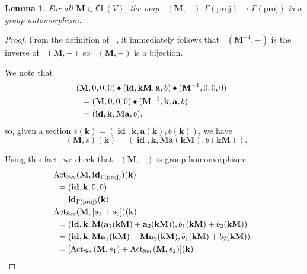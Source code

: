 \documentclass[12pt]{article}
\newcounter{counter}
\theoremstyle{definition}
\theoremstyle{plain}
\newtheorem{lem}[counter]{Lemma}
\newcommand{\id}{\mathop{\mathbf{id}}\nolimits}
\newcommand{\ActSec}
{\mathop{\mathrm{Act}_{\mathrm{Sec}}}}
\begin{document}
\begin{lem}\label{lem:ActSecAutomorphism}
    For all \(\mathbf{M} \in \mathsf{GL}(V)\), the map \(\ActSec (\mathbf{M}, -)  \colon \Gamma(\mathrm{proj}) \to \Gamma(\mathrm{proj})\) is a group automorphism.
\end{lem}

\begin{proof}
    From the definition of \(\ActSec\), it immediately follows that \(\ActSec (\mathbf{M}^{-1}, -)\) is the inverse of \(\ActSec (\mathbf{M}, -)\) so \(\ActSec (\mathbf{M}, -)\) is a bijection.
    
    We note that
    \begin{align}
        &\hskip -6 pt (\mathbf{M}, 0, 0, 0) \bullet (\id, \mathbf{kM}, \mathbf{a}, b) \bullet (\mathbf{M}^{-1}, 0, 0, 0) \\
        &= (\mathbf{M}, 0, 0, 0) \bullet (\mathbf{M}^{-1}, \mathbf{k}, \mathbf{a}, b) \\
        &= (\id, \mathbf{k}, \mathbf{Ma}, b).
    \end{align}
    so, given a section \(s (\mathbf{k}) = (\id, \mathbf{k}, \mathbf{a} (\mathbf{k}),  b (\mathbf{k}))\),
    we have
    \begin{equation}\label{eq:ActSect}
        \ActSec (\mathbf{M}, s) (\mathbf{k}) = (\id, \mathbf{k}, \mathbf{Ma} (\mathbf{kM}),  b (\mathbf{kM})).
    \end{equation}

    Using this fact, we check that \(\ActSec (\mathbf{M}, -)\) is group homomorphism:
    \begin{align}
        &\hskip -6 pt \ActSec (\mathbf{M}, \id_{\Gamma(\mathrm{proj})})(\mathbf{k}) \\
        &=  (\id, \mathbf{k}, 0, 0) \\
        &= \id_{\Gamma(\mathrm{proj})}(\mathbf{k}) \\
        &\hskip -6 pt \ActSec (\mathbf{M}, [s_1 + s_2])(\mathbf{k}) \\ &= (\id, \mathbf{k}, \mathbf{M}(\mathbf{a}_1 (\mathbf{kM}) + \mathbf{a}_2 (\mathbf{kM})),  b_1 (\mathbf{kM}) + b_2(\mathbf{kM})) \\ &= (\id, \mathbf{k}, \mathbf{Ma}_1 (\mathbf{kM}) + \mathbf{Ma}_2 (\mathbf{kM}),  b_1 (\mathbf{kM}) + b_2 (\mathbf{kM})) \\
        &= [\ActSec (\mathbf{M}, s_1) + \ActSec (\mathbf{M}, s_2)](\mathbf{k})
    \end{align}
\end{proof}
\end{document}
